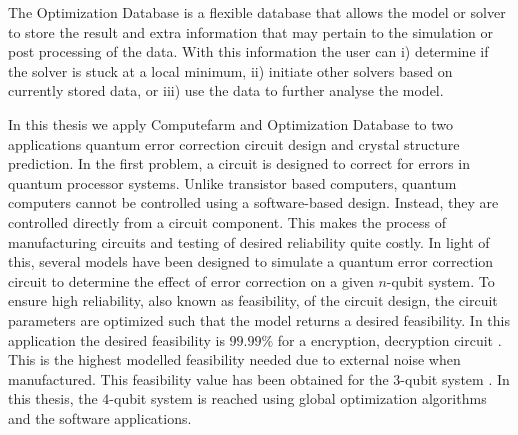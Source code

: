 The Optimization Database is a flexible database that allows the model or solver to store the result and extra information that may pertain to the simulation or post processing of the data. With this information the user can i) determine if the solver is stuck at a local minimum, ii) initiate other solvers based on currently stored data, or iii) use the data to further analyse the model. 

In this thesis we apply Computefarm and Optimization Database to two applications quantum error correction circuit design and crystal structure prediction.
In the first problem, a circuit is designed to correct for errors in quantum processor systems. Unlike transistor based computers, quantum computers cannot be controlled using a software-based design. Instead, they are controlled directly from a circuit component. This makes the process of manufacturing circuits and testing of desired reliability quite costly. In light of this, several models have been designed to simulate a quantum error correction circuit
to determine the effect of error correction on a given $n$-qubit system. To ensure high reliability, also known as feasibility, of the circuit design, the circuit parameters are optimized such that the model returns a desired feasibility. In this application the desired feasibility is $99.99\%$ for a encryption, decryption circuit \cite{Barends2014,Ghosh2013}. This is the highest modelled feasibility needed due to
external noise when manufactured. This feasibility value has been obtained for the $3$-qubit system \cite{Zahedinejad2014}. In this thesis, the $4$-qubit system is reached using global optimization algorithms and the software applications.   

